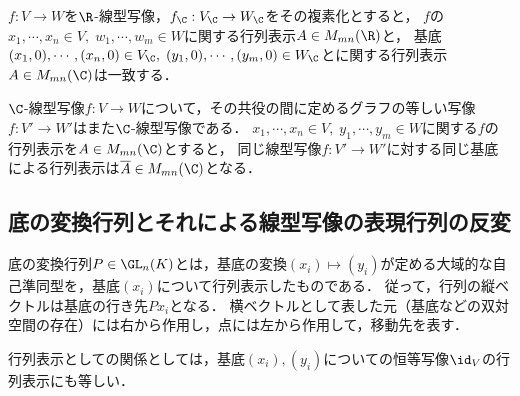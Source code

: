 \documentclass[uplatex, dvipdfmx]{jsreport}
\begin{document}
\begin{example}[複素化は表現行列を保存する]
    $f:V\to W$を$\R$-線型写像，$f_\C:V_\C\to W_\C$をその複素化とすると，
    $f$の$x_1,\cdots,x_n\in V,\;w_1,\cdots,w_m\in W$に関する行列表示$A\in M_{mn}(\R)$と，
    基底$(x_1,0),\cdots,(x_n,0)\in V_\C,\;(y_1,0),\cdots,(y_m,0)\in W_\C$とに関する行列表示$A\in M_{mn}(\C)$は一致する．
\end{example}

\begin{example}[共役の行列表示]
    $\C$-線型写像$f:V\to W$について，その共役の間に定めるグラフの等しい写像$f:V'\to W'$はまた$\C$-線型写像である．
    $x_1,\cdots,x_n\in V,\;y_1,\cdots,y_m\in W$に関する$f$の行列表示を$A\in M_{mn}(\C)$とすると，
    同じ線型写像$f:V'\to W'$に対する同じ基底による行列表示は$\overline{A}\in M_{mn}(\C)$となる．
\end{example}

\subsection{底の変換行列とそれによる線型写像の表現行列の反変}

\begin{tcolorbox}[colframe=ForestGreen, colback=ForestGreen!10!white, breakable,
    title=底の変換行列]
    底の変換行列$P\in\GL_n(K)$とは，基底の変換$(x_i)\mapsto(y_i)$が定める大域的な自己準同型を，基底$(x_i)$について行列表示したものである．
    従って，行列の縦ベクトルは基底の行き先$Px_i$となる．
    横ベクトルとして表した元（基底などの双対空間の存在）には右から作用し，点には左から作用して，移動先を表す．

    行列表示としての関係としては，基底$(x_i),(y_i)$についての恒等写像$\id_V$の行列表示にも等しい．
\end{tcolorbox}
\end{document}

